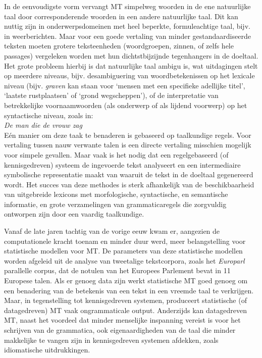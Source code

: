 \documentclass[]{../../metanetpaper}
\begin{document}
\begin{multicols}{2}
    In de eenvoudigste vorm vervangt MT simpelweg woorden in de ene natuurlijke taal door corresponderende woorden in een andere natuurlijke taal. Dit kan nuttig zijn in onderwerpsdomeinen met heel beperkte, formuleachtige taal, bijv. in weerberichten. Maar voor een goede vertaling van minder gestandaardiseerde teksten moeten grotere teksteenheden (woordgroepen, zinnen, of zelfs hele passages) vergeleken worden met hun dichtstbijzijnde tegenhangers in de doeltaal. Het grote probleem hierbij is dat natuurlijke taal ambigu is, wat uitdagingen stelt op meerdere niveaus, bijv. desambiguering van woordbetekenissen op het lexicale niveau (bijv. \emph{graven} kan staan voor `mensen met een specifieke adellijke titel', `laatste rustplaatsen' of `grond wegscheppen'), of de interpretatie van betrekkelijke voornaamwoorden (als onderwerp of als lijdend voorwerp) op het syntactische niveau, zoals in:\\

    \emph{De man die de vrouw zag}\\

    E{\'e}n manier om deze taak te benaderen is gebaseerd op taalkundige regels. Voor vertaling tussen nauw verwante talen is een directe vertaling misschien mogelijk voor simpele gevallen. Maar vaak is het nodig dat een regelgebaseerd (of kennisgedreven) systeem de ingevoerde tekst analyseert en een intermediaire symbolische representatie maakt van waaruit de tekst in de doeltaal gegenereerd wordt. Het succes van deze methodes is sterk afhankelijk van de beschikbaarheid van uitgebreide lexicons met morfologische, syntactische, en semantische informatie, en grote verzamelingen van grammaticaregels die zorgvuldig ontworpen zijn door een vaardig taalkundige.


    Vanaf de late jaren tachtig van de vorige eeuw kwam er, aangezien de computationele kracht toenam en minder duur werd, meer belangstelling voor statistische modellen voor MT. De parameters van deze statistische modellen worden afgeleid uit de analyse van tweetalige tekstcorpora, zoals het \emph{Europarl} parallelle corpus, dat de notulen van het Europees Parlement bevat in 11 Europese talen. Als er genoeg data zijn werkt statistische MT goed genoeg om een benadering van de betekenis van een tekst in een vreemde taal te verkrijgen. Maar, in tegenstelling tot kennisgedreven systemen, produceert statistische (of datagedreven) MT vaak ongrammaticale output. Anderzijds kan datagedreven MT, naast het voordeel dat minder menselijke inspanning vereist is voor het schrijven van de grammatica, ook eigenaardigheden van de taal die minder makkelijke te vangen zijn in kennisgedreven systemen afdekken, zoals idiomatische uitdrukkingen.


\end{multicols}
\end{document}
